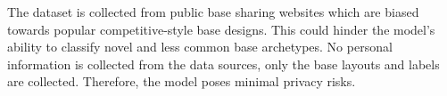 \documentclass[final]{article}
\begin{document}
The dataset is collected from public base sharing websites which are biased towards popular competitive-style base designs. This could hinder the model's ability to classify novel and less common base archetypes. No personal information is collected from the data sources, only the base layouts and labels are collected. Therefore, the model poses minimal privacy risks.

\newpage


\end{document}
